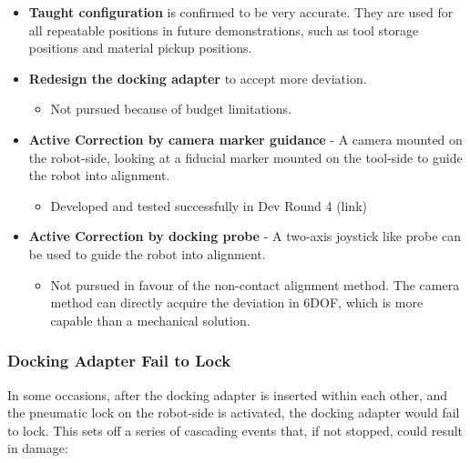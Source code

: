 \documentclass[11pt]{book}
\begin{document}
\begin{itemize}
	\item \textbf{Taught configuration} is confirmed to be very accurate. They are used for all repeatable positions in future demonstrations, such as tool storage positions and material pickup positions.

	\item \textbf{Redesign the docking adapter} to accept more deviation.

\begin{itemize}
	\item Not pursued because of budget limitations.

\end{itemize}
	\item \textbf{Active Correction by camera marker guidance} - A camera mounted on the robot-side, looking at a fiducial marker mounted on the tool-side to guide the robot into alignment.

\begin{itemize}
	\item Developed and tested successfully in Dev Round 4 (link)

\end{itemize}
	\item  \textbf{Active Correction by docking probe} - A two-axis joystick like probe can be used to guide the robot into alignment.

\begin{itemize}
	\item Not pursued in favour of the non-contact alignment method. The camera method can directly acquire the deviation in 6DOF, which is more capable than a mechanical solution.

\end{itemize}
\end{itemize}
\subsubsection{Docking Adapter Fail to Lock}

In some occasions, after the docking adapter is inserted within each other, and the pneumatic lock on the robot-side is activated, the docking adapter would fail to lock. This sets off a series of cascading events that, if not stopped, could result in damage:
\end{document}
